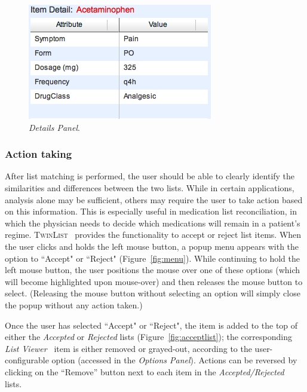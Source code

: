 \documentclass{chi2009}
\newcommand{\TwinList}{\textsc{TwinList}}
\newcommand{\ListViewer}{\textit{List Viewer}}
\newcommand{\AcceptedRejected}{\textit{Accepted/Rejected}}
\newcommand{\Details}{\textit{Details Panel}}
\newcommand{\Options}{\textit{Options Panel}}
\begin{document}
\begin{figure}[t]
\begin{center}
\includegraphics[width=1\linewidth]{img/details.png}
\end{center}
   \caption{\Details.}
   \label{fig:details}
\end{figure}

\subsubsection{Action taking}
After list matching is performed, the user should be able to clearly identify the similarities and differences between the two lists. While in certain applications, analysis alone may be sufficient, others may require the user to take action based on this information. This is especially useful in medication list reconciliation, in which the physician needs to decide which medications will remain in a patient's regime. \TwinList~ provides the functionality to accept or reject list items. When the user clicks and holds the left mouse button, a popup menu appears with the option to ``Accept" or ``Reject" (Figure~\ref{fig:menu}). While continuing to hold the left mouse button, the user positions the mouse over one of these options (which will become highlighted upon mouse-over) and then releases the mouse button to select. (Releasing the mouse button without selecting an option will simply close the popup without any action taken.)

Once the user has selected ``Accept" or ``Reject", the item is added to the top of either the \textit{Accepted} or \textit{Rejected} lists (Figure~\ref{fig:acceptlist}); the corresponding \ListViewer~ item is either removed or grayed-out, according to the user-configurable option (accessed in the \Options). Actions can be reversed by clicking on the ``Remove'' button next to each item in the \AcceptedRejected~ lists.
\end{document}
